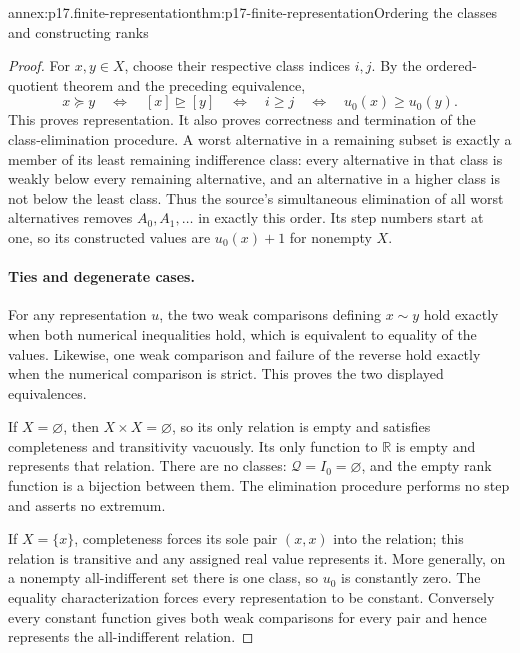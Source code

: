 \begin{annexitem}{annex:p17.finite-representation}{thm:p17-finite-representation}{Ordering the classes and constructing ranks}
\begin{proof}
For \(x,y\in X\), choose their respective class indices \(i,j\).
By the ordered-quotient theorem and the preceding equivalence,
\[
 x\succeq y\quad\Longleftrightarrow\quad
 [x]\unrhd[y]\quad\Longleftrightarrow\quad
 i\geq j\quad\Longleftrightarrow\quad u_0(x)\geq u_0(y).
\]
This proves representation. It also proves correctness and termination of
the class-elimination procedure. A worst alternative in a remaining subset
is exactly a member of its least remaining indifference class: every
alternative in that class is weakly below every remaining alternative, and
an alternative in a higher class is not below the least class. Thus the
source's simultaneous elimination of all worst alternatives removes
\(A_0,A_1,\ldots\) in exactly this order. Its step numbers start at
one, so its constructed values are \(u_0(x)+1\) for nonempty \(X\).

\paragraph{Ties and degenerate cases.}
For any representation \(u\), the two weak comparisons defining
\(x\sim y\) hold exactly when both numerical inequalities hold, which
is equivalent to equality of the values. Likewise, one weak comparison
and failure of the reverse hold exactly when the numerical comparison is
strict. This proves the two displayed equivalences.

If \(X=\varnothing\), then \(X\times X=\varnothing\), so its
only relation is empty and satisfies completeness and transitivity
vacuously. Its only function to \(\mathbb{R}\) is empty and represents that
relation. There are no classes: \(\mathcal Q=I_0=\varnothing\),
and the empty rank function is a bijection between them. The elimination
procedure performs no step and asserts no extremum.

If \(X=\{x\}\), completeness forces its sole pair \((x,x)\)
into the relation; this relation is transitive and any assigned real value
represents it. More generally, on a nonempty all-indifferent set there is
one class, so \(u_0\) is constantly zero. The equality characterization
forces every representation to be constant. Conversely every constant
function gives both weak comparisons for every pair and hence represents
the all-indifferent relation.
\end{proof}
\end{annexitem}

